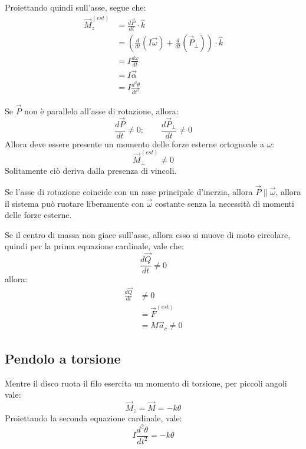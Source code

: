 \documentclass[11pt, a4paper, openright]{book}
\theoremstyle{plain}
\theoremstyle{definition}
\begin{document}
Proiettando quindi sull'asse, segue che:
\begin{align}
    \vec{M}_z^{(est)} & = \frac{d\vec{P}}{dt} \cdot \hat{k} \\
                      & = (\frac{d}{dt}(I \vec{\omega}) + \frac{d}{dt}(\vec{P}_\perp)) \cdot \hat{k} \\
                      & = I \frac{d\omega}{dt} \\
                      & = I \vec{\alpha} \\
                      & = I \frac{d^2 \theta}{dt^2}
\end{align}

Se $\vec{P}$ non è parallelo all'asse di rotazione, allora:
\begin{equation}
    \frac{d\vec{P}}{dt} \not = 0; \quad \quad \frac{d\vec{P}_\perp}{dt} \not = 0
\end{equation}
Allora deve essere presente un momento delle forze esterne ortognoale a $\omega$:
\begin{equation}
    \vec{M}_\perp^{(est)} \not = 0
\end{equation}
Solitamente ciò deriva dalla presenza di vincoli.

Se l'asse di rotazione coincide con un asse principale d'inerzia, allora $\vec{P} \parallel \vec{\omega}$, allora il sistema può ruotare liberamente con $\vec{\omega}$ costante senza la necessità di momenti delle forze esterne.

Se il centro di massa non giace sull'asse, allora esso si muove di moto circolare, quindi per la prima equazione cardinale, vale che:
\begin{equation}
    \frac{d\vec{Q}}{dt} \not = 0
\end{equation}
allora:
\begin{align}
    \frac{d\vec{Q}}{dt} & \not = 0 \\
    & = \vec{F}^{(est)} \\
    & = M\vec{a}_c \not = 0
\end{align}

\subsection{Pendolo a torsione}
Mentre il disco ruota il filo esercita un momento di torsione, per piccoli angoli vale:
\begin{equation}
    \vec{M}_z = \vec{M} = - k \theta
\end{equation}
Proiettando la seconda equazione cardinale, vale:
\begin{equation}
    I \frac{d^2\theta}{dt^2} = -k \theta
\end{equation}
\end{document}
